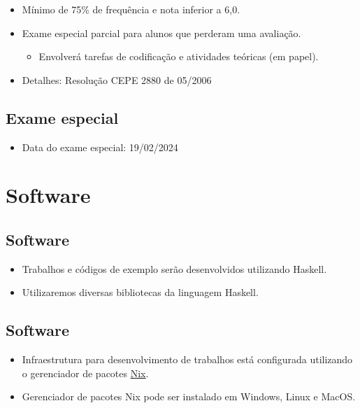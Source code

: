 \documentclass[11pt]{article}
\begin{document}
\begin{itemize}
\item Mínimo de 75\% de frequência e nota inferior a 6,0.

\item Exame especial parcial para alunos que perderam uma avaliação.
\begin{itemize}
\item Envolverá tarefas de codificação e atividades teóricas (em papel).
\end{itemize}

\item Detalhes: Resolução CEPE 2880 de 05/2006
\end{itemize}
\subsection*{Exame especial}
\label{sec:orgb54b02d}

\begin{itemize}
\item Data do exame especial: 19/02/2024
\end{itemize}
\section*{Software}
\label{sec:orgb186b2e}

\subsection*{Software}
\label{sec:org6d23779}

\begin{itemize}
\item Trabalhos e códigos de exemplo serão desenvolvidos utilizando Haskell.

\item Utilizaremos diversas bibliotecas da linguagem Haskell.
\end{itemize}
\subsection*{Software}
\label{sec:orgdeef940}

\begin{itemize}
\item Infraestrutura para desenvolvimento de trabalhos está configurada utilizando o gerenciador de pacotes \href{https://nixos.org/}{Nix}.

\item Gerenciador de pacotes Nix pode ser instalado em Windows, Linux e MacOS.
\end{itemize}
\end{document}
